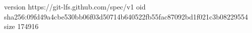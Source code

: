 version https://git-lfs.github.com/spec/v1
oid sha256:09fd49a4cbe530bb06f03d50714b640522fb55fac87092bd1f021c3b08229554
size 174916
